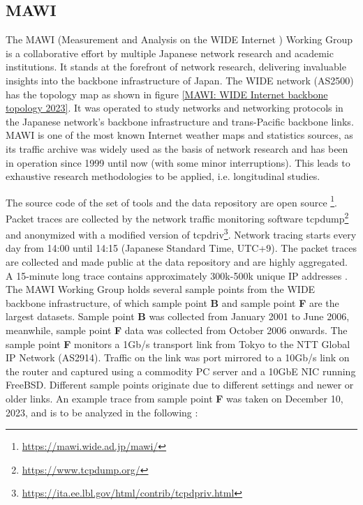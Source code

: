 \documentclass[sigconf,authorversion,nonacm]{acmart}
\begin{document}
\subsection{MAWI} The MAWI (Measurement and Analysis on the WIDE Internet \cite{271335}) Working Group is a collaborative effort by multiple Japanese network research and academic institutions. It stands at the forefront of network research, delivering invaluable insights into the backbone infrastructure of Japan. The WIDE network (AS2500) has the topology map as shown in figure \ref{MAWI: WIDE Internet backbone topology 2023}. It was operated to study networks and networking protocols in the Japanese network's backbone infrastructure and trans-Pacific backbone links. MAWI is one of the most known Internet weather maps and statistics sources, as its traffic archive was widely used as the basis of network research and has been in operation since 1999 until now (with some minor interruptions). This leads to exhaustive research methodologies to be applied, i.e. longitudinal studies.

The source code of the set of tools and the data repository are open source \footnote{\url{https://mawi.wide.ad.jp/mawi/}}. Packet traces are collected by the network traffic monitoring software tcpdump\footnote{\url{https://www.tcpdump.org/}} and anonymized with a modified version of tcpdriv\footnote{\url{https://ita.ee.lbl.gov/html/contrib/tcpdpriv.html}}. Network tracing starts every day from 14:00 until 14:15 (Japanese Standard Time, UTC+9). The packet traces are collected and made public at the data repository and are highly aggregated. A 15-minute long trace contains approximately 300k-500k unique IP addresses \cite{5061979}. The MAWI Working Group holds several sample points from the WIDE backbone infrastructure, of which sample point \textbf{B} and sample point \textbf{F} are the largest datasets. Sample point \textbf{B} was collected from January 2001 to June 2006, meanwhile, sample point \textbf{F} data was collected from October 2006 onwards. The sample point \textbf{F} monitors a 1Gb/s transport link from Tokyo to the NTT Global IP Network (AS2914). Traffic on the link was port mirrored to a 10Gb/s link on the router and captured using a commodity PC server and a 10GbE NIC running FreeBSD. Different sample points originate due to different settings and newer or older links. An example trace from sample point \textbf{F} was taken on December 10, 2023, and is to be analyzed in the following \cite{traceMAWI}:
\end{document}
